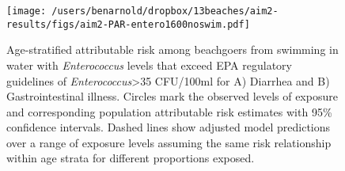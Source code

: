 \documentclass[11pt]{article}
\begin{document}
\begin{figure}[htbp]
\begin{center}
\texttt{[image: /users/benarnold/dropbox/13beaches/aim2-results/figs/aim2-PAR-entero1600noswim.pdf]} 
\begin{minipage}{0.5\textwidth}
\caption{Age-stratified attributable risk among beachgoers from swimming in water with \textit{Enterococcus} levels that exceed EPA regulatory guidelines of \textit{Enterococcus}>35 CFU/100ml for A) Diarrhea and B) Gastrointestinal illness.  Circles mark the observed levels of exposure and corresponding population attributable risk estimates with 95\% confidence intervals. Dashed lines show adjusted model predictions over a range of exposure levels assuming the same risk relationship within age strata for different proportions exposed.}
\label{fig:enteroPAR}
\end{minipage}
\end{center}
\end{figure}
\end{document}
